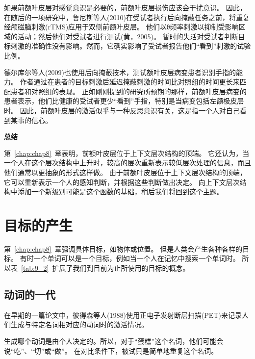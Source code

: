 如果前额叶皮层对感觉意识是必要的，前额叶皮层损伤应该会干扰意识。
因此，在随后的一项研究中，鲁尼斯等人(2010)在受试者执行后向掩蔽任务之前，将重复经颅磁脑刺激(rTMS)应用于双侧前额叶皮层。
他们以θ频率刺激以抑制受影响区域的活动；然后他们对受试者进行测试(黄，2005)。
暂时的失活对受试者判断目标刺激的准确性没有影响。然而，它确实影响了受试者报告他们“看到”刺激的试验比例。
\par


德尔库尔等人(2009)也使用后向掩蔽技术，测试额叶皮层病变患者识别手指的能力。
作者通过在患者的目标刺激后延迟掩蔽刺激的时间比对照组的时间更长来匹配患者和对照组的表现。
正如刚刚提到的研究所预期的那样，前额叶皮层病变的患者表示，他们比健康的受试者更少“看到”手指，特别是当病变包括左额极皮层时。
因此，前额叶皮层的激活似乎与一种反思意识有关，这是指一个人对自己看到某事的信心。
\par


\textbf{总结}
\par

第~\ref{chap:chap8}~章表明，前额叶皮层位于上下文层次结构的顶端。
它还认为，当一个人在这个层次结构中上升时，较高的层次重新表示较低层次处理的信息，而且他们通常以更抽象的形式这样做。
由于前额叶皮层位于上下文层次结构的顶端，它可以重新表示一个人的感知判断，并根据这些判断做出决定。
向上下文层次结构中添加一个新级别可能是这个函数的基础，稍后我们将回到这个主题。



\section{目标的产生}
\par

第~\ref{chap:chap8}~章强调具体目标，如物体或位置。
但是人类会产生各种各样的目标。
有时一个单词可以是一个目标，例如当一个人在记忆中搜索一个单词时。
所以表~\ref{tab:9_2}~扩展了我们到目前为止所使用的目标的概念。



\subsection{动词的一代}
\par
在早期的一篇论文中，彼得森等人(1988)使用正电子发射断层扫描(PET)来记录人们生成与特定名词相对应的动词时的激活情况。
\par

生成哪个动词是由个人决定的。所以，对于“蛋糕”这个名词，他们可能会说“吃”、“切”或“做”。
在对比条件下，被试只是简单地重复这个名词。
\par

